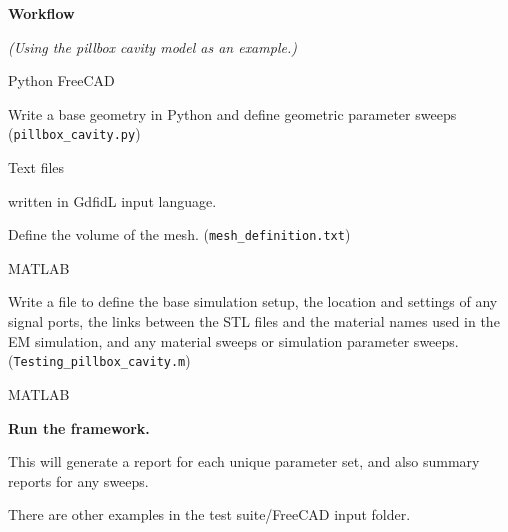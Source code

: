\documentclass[11pt]{article}
\begin{document}
\begin{center}
\textbf{Workflow}

\emph{(Using the pillbox cavity model as an example.)}
\end{center}
\begin{turn}{45}
\begin{minipage}{0.2\linewidth}
\textcolor[rgb]{0.50,0.50,1.00}{Python FreeCAD}
\end{minipage}
\end{turn}
\begin{minipage}{0.8\linewidth}
Write a base geometry in Python and define geometric parameter sweeps (\verb|pillbox_cavity.py|)
\vspace{10mm}
\end{minipage}

\begin{turn}{45}
\begin{minipage}{0.2\linewidth}
\textcolor[rgb]{0.50,0.50,1.00}{Text files}

\textcolor[rgb]{0.50,0.50,1.00}{written in GdfidL input language.}
\end{minipage}
\end{turn}
\begin{minipage}{0.6\linewidth}
Define the volume of the mesh. (\verb|mesh_definition.txt|)
\vspace{10mm}
\end{minipage}

\begin{turn}{45}
\begin{minipage}{0.2\linewidth}
\textcolor[rgb]{0.50,0.50,1.00}{MATLAB}
\end{minipage}
\end{turn}
\begin{minipage}{0.8\linewidth}
Write a file to define the base simulation setup, the location and settings of any signal ports, the links between the STL files and the material names used in the EM simulation, and any material sweeps or simulation parameter sweeps. (\verb|Testing_pillbox_cavity.m|)
\vspace{10mm}
\end{minipage}

\begin{turn}{45}
\begin{minipage}{0.2\linewidth}
\textcolor[rgb]{0.50,0.50,1.00}{MATLAB}
\end{minipage}
\end{turn}
\begin{minipage}{0.8\linewidth}
\textbf{Run the framework.}

This will generate a report for each unique parameter set, and also summary reports for any sweeps.
\vspace{10mm}
\end{minipage}

There are other examples in the test suite/FreeCAD input folder.
\end{document}
